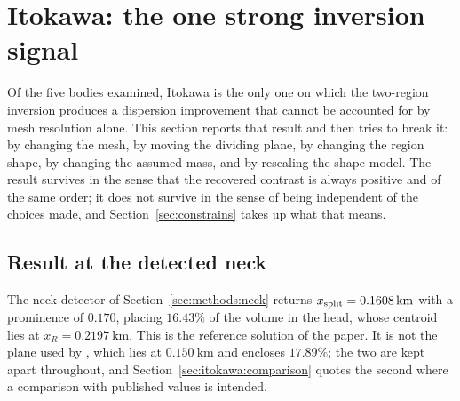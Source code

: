 %
%
%

\section{Itokawa: the one strong inversion signal}
\label{sec:itokawa}

Of the five bodies examined, Itokawa is the only one on which the
two-region inversion produces a dispersion improvement that cannot be
accounted for by mesh resolution alone. This section reports that result
and then tries to break it: by changing the mesh, by moving the dividing
plane, by changing the region shape, by changing the assumed mass, and by
rescaling the shape model. The result survives in the sense that the
recovered contrast is always positive and of the same order; it does not
survive in the sense of being independent of the choices made, and
Section~\ref{sec:constrains} takes up what that means.

\subsection{Result at the detected neck}
\label{sec:itokawa:reference}

The neck detector of Section~\ref{sec:methods:neck} returns
$x_{\mathrm{split}} = \SI{0.1608}{\kilo\metre}$ with a prominence of $0.170$,
placing $16.43\%$ of the volume in the head, whose centroid lies at
$x_R = \SI{+0.2197}{\kilo\metre}$. This is the reference solution of the
paper. It is not the plane used by \citet{kanamaru2019}, which lies at
$\SI{0.150}{\kilo\metre}$ and encloses $17.89\%$; the two are kept apart
throughout, and Section~\ref{sec:itokawa:comparison} quotes the second
where a comparison with published values is intended.

